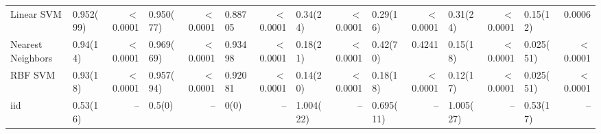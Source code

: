 \documentclass[a0,landscape]{a0poster}
\begin{document}
\begin{multicols}{2}
\begin{center}
{\begin{tabular}{|l|l|r|l|r|l|r|l|r|l|r|l|r|l|r|}
\midrule
Linear SVM        &  0.952(99) &  $<$0.0001 &  0.950(77) &  $<$0.0001 &  0.88705 &  $<$0.0001 &  0.34(24)  &  $<$0.0001 &    0.29(16)  &  $<$0.0001 &  0.31(24)  &  $<$0.0001 &  0.15(12)  &   0.0006 \\
Nearest Neighbors &  0.94(14)  &  $<$0.0001 &  0.969(69) &  $<$0.0001 &  0.93498 &  $<$0.0001 &  0.18(21)  &  $<$0.0001 &    0.42(70)  &   0.4241 &  0.15(18)  &  $<$0.0001 &  0.025(51) &  $<$0.0001 \\
RBF SVM           &  0.93(18)  &  $<$0.0001 &  0.957(94) &  $<$0.0001 &  0.92081 &  $<$0.0001 &  0.14(20)  &  $<$0.0001 &    0.18(18)  &  $<$0.0001 &  0.12(17)  &  $<$0.0001 &  0.025(51) &  $<$0.0001 \\
iid               &  0.53(16)  &     {--} &  0.5(0)    &     {--} &  0(0)    &     {--} &  1.004(22) &     {--} &    0.695(11) &     {--} &  1.005(27) &     {--} &  0.53(17)  &     {--} \\
\bottomrule
\end{tabular}
}
\end{center}


\end{multicols}
\end{document}
